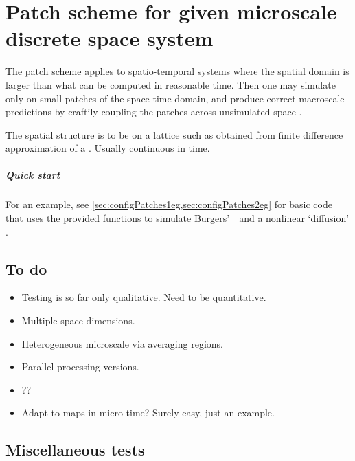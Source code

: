 \chapter{Patch scheme for given microscale discrete space system}
\label{sec:patch}
\localtableofcontents

The patch scheme applies to spatio-temporal systems where
the spatial domain is larger than what can be computed in
reasonable time. Then one may simulate only on small patches
of the space-time domain, and produce correct macroscale
predictions by craftily coupling the patches across
unsimulated space \cite[e.g.]{Hyman2005, Samaey03b,
Samaey04, Roberts06d, Liu2015}.

The spatial structure is to be on a lattice such as obtained
from finite difference approximation of a \pde. Usually
continuous in time.

\paragraph{Quick start}
For an example, see \cref{sec:configPatches1eg,sec:configPatches2eg}  for basic code that uses the provided functions to simulate Burgers'~\pde\ and a nonlinear `diffusion' \pde.




\begin{userMan}


%
%
%
%
%

\end{userMan}



\begin{userMan}




\section{To do}
\begin{itemize}
\item Testing is so far only qualitative.  Need to be quantitative.
\item Multiple space dimensions.
\item Heterogeneous microscale via averaging regions.
\item Parallel processing versions.
\item ??
\item Adapt to maps in micro-time?  Surely easy, just an example.
\end{itemize}


\section{Miscellaneous tests}



\end{userMan}
